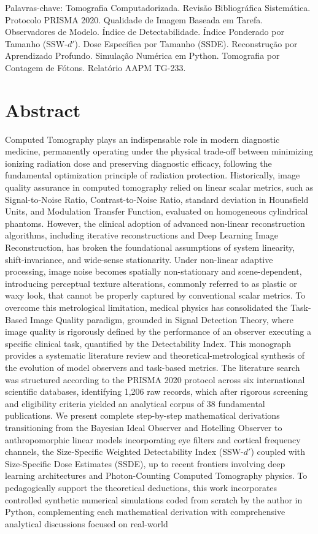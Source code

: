 \documentclass[
  12pt,
  a4paper,
  oneside
]{report}
\begin{document}
\vspace{0.8cm}
\noindent Palavras-chave: Tomografia Computadorizada. Revisão Bibliográfica Sistemática. Protocolo PRISMA 2020. Qualidade de Imagem Baseada em Tarefa. Observadores de Modelo. Índice de Detectabilidade. Índice Ponderado por Tamanho (SSW-$d'$). Dose Específica por Tamanho (SSDE). Reconstrução por Aprendizado Profundo. Simulação Numérica em Python. Tomografia por Contagem de Fótons. Relatório AAPM TG-233.
\clearpage

\chapter*{Abstract}

Computed Tomography plays an indispensable role in modern diagnostic medicine, permanently operating under the physical trade-off between minimizing ionizing radiation dose and preserving diagnostic efficacy, following the fundamental optimization principle of radiation protection. Historically, image quality assurance in computed tomography relied on linear scalar metrics, such as Signal-to-Noise Ratio, Contrast-to-Noise Ratio, standard deviation in Hounsfield Units, and Modulation Transfer Function, evaluated on homogeneous cylindrical phantoms. However, the clinical adoption of advanced non-linear reconstruction algorithms, including iterative reconstructions and Deep Learning Image Reconstruction, has broken the foundational assumptions of system linearity, shift-invariance, and wide-sense stationarity. Under non-linear adaptive processing, image noise becomes spatially non-stationary and scene-dependent, introducing perceptual texture alterations, commonly referred to as plastic or waxy look, that cannot be properly captured by conventional scalar metrics. To overcome this metrological limitation, medical physics has consolidated the Task-Based Image Quality paradigm, grounded in Signal Detection Theory, where image quality is rigorously defined by the performance of an observer executing a specific clinical task, quantified by the Detectability Index. This monograph provides a systematic literature review and theoretical-metrological synthesis of the evolution of model observers and task-based metrics. The literature search was structured according to the PRISMA 2020 protocol across six international scientific databases, identifying 1,206 raw records, which after rigorous screening and eligibility criteria yielded an analytical corpus of 38 fundamental publications. We present complete step-by-step mathematical derivations transitioning from the Bayesian Ideal Observer and Hotelling Observer to anthropomorphic linear models incorporating eye filters and cortical frequency channels, the Size-Specific Weighted Detectability Index (SSW-$d'$) coupled with Size-Specific Dose Estimates (SSDE), up to recent frontiers involving deep learning architectures and Photon-Counting Computed Tomography physics. To pedagogically support the theoretical deductions, this work incorporates controlled synthetic numerical simulations coded from scratch by the author in Python, complementing each mathematical derivation with comprehensive analytical discussions focused on real-world 
\end{document}
